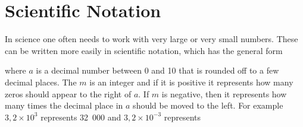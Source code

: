     \section{Scientific Notation}
            \nopagebreak
      \label{m38346*id177822}In science one often needs to work with very large or very small numbers. These
can be written more easily in scientific notation, which has the general form\par 
      \label{m38346*uid51}\nopagebreak\noindent{}
      \label{m38346*id177854}where $a$ is a decimal number between 0 and 10 that is rounded off to a few
decimal places. The $m$ is an integer and if it is positive it represents how
many zeros should appear to the right of $a$. If $m$ is negative, then it
represents how many times the decimal place in $a$ should be moved to the left.
For example $3,2\ensuremath{\times}{10}^{3}$ represents 32~000 and $3,2\ensuremath{\times}{10}^{-3}$ represents
